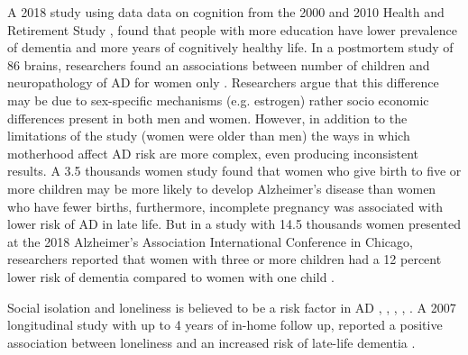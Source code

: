 \documentclass[11pt]{article}
\theoremstyle{definition}
\theoremstyle{remark}
\begin{document}
A 2018 study using data data on cognition from the 2000 and 2010 Health and Retirement Study \cite{crimmins2018educational}, found that people with more education have lower prevalence of dementia and more years of cognitively healthy life. In a postmortem study of 86 brains, researchers found an associations between number of children and neuropathology of AD for women only \cite{beeri2009number}. Researchers argue that this difference may be due to sex-specific mechanisms (e.g. estrogen) rather socio economic differences present in both men and women. However, in addition to the limitations of the study (women were older than men) the ways in which motherhood affect AD risk are more complex, even producing inconsistent results. A 3.5 thousands women study \cite{jang2018differential} found that women who give birth to five or more children may be more likely to develop Alzheimer's disease than women who have fewer births, furthermore, incomplete pregnancy was associated with lower risk of AD in late life. But in a study with 14.5 thousands women presented at the 2018 Alzheimer’s Association International Conference in Chicago, researchers reported that women with three or more children had a 12 percent lower risk of dementia compared to women with one child \cite{AAIC2018}.

Social isolation and loneliness is believed to be a risk factor in AD \cite{holmen1992loneliness}, \cite{fratiglioni2000influence}, \cite{shankar2013social}, \cite{holwerda2014feelings}, \cite{evans2018social}. A 2007 longitudinal study with up to 4 years of in-home follow up, reported a positive association between loneliness and an increased risk of late-life dementia \cite{wilson2007loneliness}. 
\end{document}
